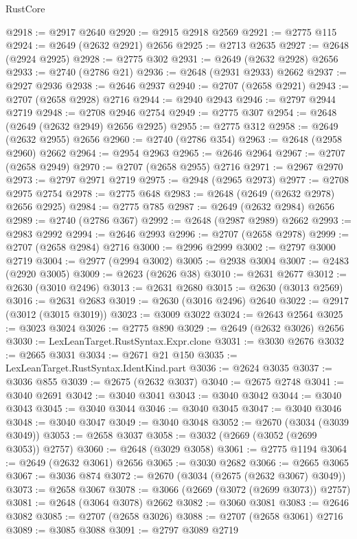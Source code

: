 \begin{lexlean}{RustCore}
\begin{coremodule}
@2918 := @2917 @2640
@2920 := @2915 @2918 @2569
@2921 := @2775 @115
@2924 := @2649 (@2632 @2921) @2656
@2925 := @2713 @2635
@2927 := @2648 (@2924 @2925)
@2928 := @2775 @302
@2931 := @2649 (@2632 @2928) @2656
@2933 := @2740 (@2786 @21)
@2936 := @2648 (@2931 @2933) @2662
@2937 := @2927 @2936
@2938 := @2646 @2937
@2940 := @2707 (@2658 @2921)
@2943 := @2707 (@2658 @2928) @2716
@2944 := @2940 @2943
@2946 := @2797 @2944 @2719
@2948 := @2708 @2946 @2754
@2949 := @2775 @307
@2954 := @2648 (@2649 (@2632 @2949) @2656 @2925)
@2955 := @2775 @312
@2958 := @2649 (@2632 @2955) @2656
@2960 := @2740 (@2786 @354)
@2963 := @2648 (@2958 @2960) @2662
@2964 := @2954 @2963
@2965 := @2646 @2964
@2967 := @2707 (@2658 @2949)
@2970 := @2707 (@2658 @2955) @2716
@2971 := @2967 @2970
@2973 := @2797 @2971 @2719
@2975 := @2948 (@2965 @2973)
@2977 := @2708 @2975 @2754
@2978 := @2775 @648
@2983 := @2648 (@2649 (@2632 @2978) @2656 @2925)
@2984 := @2775 @785
@2987 := @2649 (@2632 @2984) @2656
@2989 := @2740 (@2786 @367)
@2992 := @2648 (@2987 @2989) @2662
@2993 := @2983 @2992
@2994 := @2646 @2993
@2996 := @2707 (@2658 @2978)
@2999 := @2707 (@2658 @2984) @2716
@3000 := @2996 @2999
@3002 := @2797 @3000 @2719
@3004 := @2977 (@2994 @3002)
@3005 := @2938 @3004
@3007 := @2483 (@2920 @3005)
@3009 := @2623 (@2626 @38)
@3010 := @2631 @2677
@3012 := @2630 (@3010 @2496)
@3013 := @2631 @2680
@3015 := @2630 (@3013 @2569)
@3016 := @2631 @2683
@3019 := @2630 (@3016 @2496) @2640
@3022 := @2917 (@3012 (@3015 @3019))
@3023 := @3009 @3022
@3024 := @2643 @2564
@3025 := @3023 @3024
@3026 := @2775 @890
@3029 := @2649 (@2632 @3026) @2656
@3030 := LexLeanTarget.RustSyntax.Expr.clone
@3031 := @3030 @2676
@3032 := @2665 @3031
@3034 := @2671 @21 @150
@3035 := LexLeanTarget.RustSyntax.IdentKind.part
@3036 := @2624 @3035
@3037 := @3036 @855
@3039 := @2675 (@2632 @3037)
@3040 := @2675 @2748
@3041 := @3040 @2691
@3042 := @3040 @3041
@3043 := @3040 @3042
@3044 := @3040 @3043
@3045 := @3040 @3044
@3046 := @3040 @3045
@3047 := @3040 @3046
@3048 := @3040 @3047
@3049 := @3040 @3048
@3052 := @2670 (@3034 (@3039 @3049))
@3053 := @2658 @3037
@3058 := @3032 (@2669 (@3052 (@2699 @3053)) @2757)
@3060 := @2648 (@3029 @3058)
@3061 := @2775 @1194
@3064 := @2649 (@2632 @3061) @2656
@3065 := @3030 @2682
@3066 := @2665 @3065
@3067 := @3036 @874
@3072 := @2670 (@3034 (@2675 (@2632 @3067) @3049))
@3073 := @2658 @3067
@3078 := @3066 (@2669 (@3072 (@2699 @3073)) @2757)
@3081 := @2648 (@3064 @3078) @2662
@3082 := @3060 @3081
@3083 := @2646 @3082
@3085 := @2707 (@2658 @3026)
@3088 := @2707 (@2658 @3061) @2716
@3089 := @3085 @3088
@3091 := @2797 @3089 @2719

\end{coremodule}
\end{lexlean}
